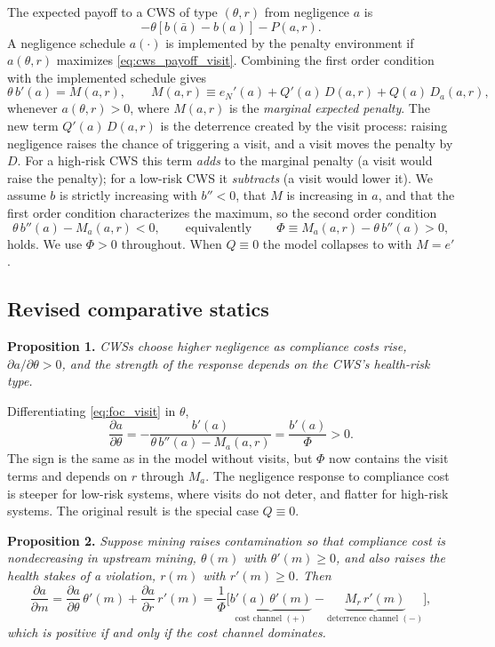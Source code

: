 The expected payoff to a CWS of type $(\theta,r)$ from negligence $a$ is
\begin{equation}\label{eq:cws_payoff_visit}
-\theta[b(\bar{a})-b(a)] - P(a,r).
\end{equation}
A negligence schedule $a(\cdot)$ is implemented by the penalty environment if $a(\theta,r)$ maximizes \eqref{eq:cws_payoff_visit}. Combining the first order condition with the implemented schedule gives
\begin{equation}\label{eq:foc_visit}
\theta\, b'(a) = M(a,r), \qquad M(a,r) \equiv e_N'(a) + Q'(a)\,D(a,r) + Q(a)\,D_a(a,r),
\end{equation}
whenever $a(\theta,r)>0$, where $M(a,r)$ is the \emph{marginal expected penalty}. The new term $Q'(a)\,D(a,r)$ is the deterrence created by the visit process: raising negligence raises the chance of triggering a visit, and a visit moves the penalty by $D$. For a high-risk CWS this term \emph{adds} to the marginal penalty (a visit would raise the penalty); for a low-risk CWS it \emph{subtracts} (a visit would lower it). We assume $b$ is strictly increasing with $b''<0$, that $M$ is increasing in $a$, and that the first order condition characterizes the maximum, so the second order condition
\[
\theta\, b''(a) - M_a(a,r) < 0, \qquad\text{equivalently}\qquad \Phi \equiv M_a(a,r) - \theta\, b''(a) > 0,
\]
holds. We use $\Phi>0$ throughout. When $Q\equiv 0$ the model collapses to \cite{kang2021understanding} with $M=e'$.

\subsection{Revised comparative statics}

\noindent\textbf{Proposition 1.} \emph{CWSs choose higher negligence as compliance costs rise, $\partial a/\partial\theta > 0$, and the strength of the response depends on the CWS's health-risk type.}

Differentiating \eqref{eq:foc_visit} in $\theta$,
\[
\frac{\partial a}{\partial\theta} = -\frac{b'(a)}{\theta\, b''(a) - M_a(a,r)} = \frac{b'(a)}{\Phi} > 0 .
\]
The sign is the same as in the model without visits, but $\Phi$ now contains the visit terms and depends on $r$ through $M_a$. The negligence response to compliance cost is steeper for low-risk systems, where visits do not deter, and flatter for high-risk systems. The original result is the special case $Q\equiv 0$.

\medskip
\noindent\textbf{Proposition 2.} \emph{Suppose mining raises contamination so that compliance cost is nondecreasing in upstream mining, $\theta(m)$ with $\theta'(m)\ge 0$, and also raises the health stakes of a violation, $r(m)$ with $r'(m)\ge 0$. Then}
\[
\frac{\partial a}{\partial m} = \frac{\partial a}{\partial\theta}\,\theta'(m) + \frac{\partial a}{\partial r}\,r'(m) = \frac{1}{\Phi}\Big[\underbrace{b'(a)\,\theta'(m)}_{\text{cost channel }(+)} - \underbrace{M_r\,r'(m)}_{\text{deterrence channel }(-)}\Big],
\]
\emph{which is positive if and only if the cost channel dominates.}

